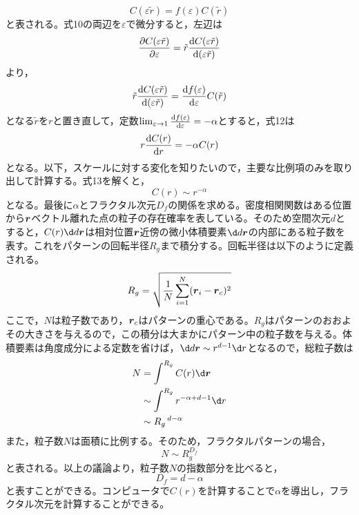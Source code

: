 \documentclass{ltjsarticle}
\begin{document}
\begin{equation}
  C(\varepsilon \tilde{r})=f(\varepsilon)C(\tilde{r})
\end{equation}
と表される。式10の両辺を$\varepsilon$で微分すると，左辺は
\begin{equation}
  \pdv{C(\varepsilon \tilde{r})}{\varepsilon}=\tilde{r}\odv{C(\varepsilon \tilde{r})}{(\varepsilon \tilde{r})}
\end{equation}
より，
\begin{equation}
  \tilde{r}\odv{C(\varepsilon \tilde{r})}{(\varepsilon \tilde{r})}=\odv{f(\varepsilon)}{\varepsilon}C(\tilde{r})
\end{equation}
となる$\tilde{r}$を$r$と置き直して，定数$\lim_{\varepsilon \to 1}\odv{f(\varepsilon)}{\varepsilon}
  =-\alpha$とすると，式12は
\begin{equation}
  r\odv{C(r)}{r}=-\alpha C(r)
\end{equation}
となる。以下，スケールに対する変化を知りたいので，主要な比例項のみを取り出して計算する。式13を解くと，
\begin{equation}
  C(r)\sim r^{-\alpha}
\end{equation}
となる。最後に$\alpha$とフラクタル次元$D_f$の関係を求める。密度相関関数はある位置から$\vb*{r}$ベクトル離れた点の粒子の存在確率を表している。そのため空間次元$d$とすると，$C(r)\d d{\vb*{r}}$は相対位置$\vb*{r}$近傍の微小体積要素$\d d \vb*{r}$の内部にある粒子数を表す。これをパターンの回転半径$R_g$まで積分する。回転半径は以下のように定義される。
\begin{equation}
  R_g=\sqrt{\frac{1}{N}\sum^{N}_{i=1}(\vb*{r}_i-\vb*{r}_c)^2}
\end{equation}
ここで，$N$は粒子数であり，$\vb*{r}_c$はパターンの重心である。$R_g$はパターンのおおよその大きさを与えるので，この積分は大まかにパターン中の粒子数を与える。体積要素は角度成分による定数を省けば，$\d d\vb*{r}\sim r^{d-1}\d r$となるので，総粒子数は
\begin{equation}
  \begin{split}
    N&=\int^{R_g}C(r)\d \vb*{r}\\
    &\sim\int^{R_g}r^{-\alpha+d-1}\d r\\
    &\sim R_g\,^{d-\alpha}
  \end{split}
\end{equation}
また，粒子数$N$は面積に比例する。そのため，フラクタルパターンの場合，
\begin{equation}
  N\sim R_g^{D_f}
\end{equation}
と表される。以上の議論より，粒子数$N$の指数部分を比べると，
\begin{equation}
  D_f=d-\alpha
\end{equation}
と表すことができる。コンピュータで$C(r)$を計算することで$\alpha$を導出し，フラクタル次元を計算することができる。
\end{document}
